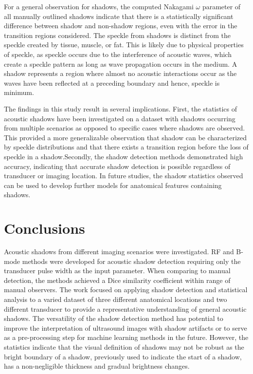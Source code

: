 \documentclass[preprint,5p,authoryear]{elsarticle}
\begin{document}
For a general observation for shadows, the computed Nakagami $\omega$ parameter of all manually outlined shadows indicate that there is a statistically significant difference between shadow and non-shadow regions, even with the error in the transition regions considered. The speckle from shadows is distinct from the speckle created by tissue, muscle, or fat. This is likely due to physical properties of speckle, as speckle occurs due to the interference of acoustic waves, which create a speckle pattern as long as wave propagation occurs in the medium. A shadow represents a region where almost no acoustic interactions occur as the waves have been reflected at a preceding boundary and hence, speckle is minimum. 

The findings in this study result in several implications. First, the statistics of acoustic shadows have been investigated on a dataset with shadows occurring from multiple scenarios as opposed to specific cases where shadows are observed. This provided a more generalizable observation that shadow can be characterized by speckle distributions and that there exists a transition region before the loss of speckle in a shadow.Secondly, the shadow detection methods demonstrated high accuracy, indicating that accurate shadow detection is possible regardless of transducer or imaging location. In future studies, the shadow statistics observed can be used to develop further models for anatomical features containing shadows. 

\section*{Conclusions}
\label{Conclusions}
Acoustic shadows from different imaging scenarios were investigated. RF and B-mode methods were developed for acoustic shadow detection requiring only the transducer pulse width as the input parameter. When comparing to manual detection, the methods achieved a Dice similarity coefficient within range of manual observers. The work focused on applying shadow detection and statistical analysis to a varied dataset of three different anatomical locations and two different transducer to provide a representative understanding of general acoustic shadows. The versatility of the shadow detection method has potential to improve the interpretation of ultrasound images with shadow artifacts or to serve as a pre-processing step for machine learning methods in the future. However, the statistics indicate that the visual definition of shadows may not be robust as the bright boundary of a shadow, previously used to indicate the start of a shadow, has a non-negligible thickness and gradual brightness changes. 
\end{document}
